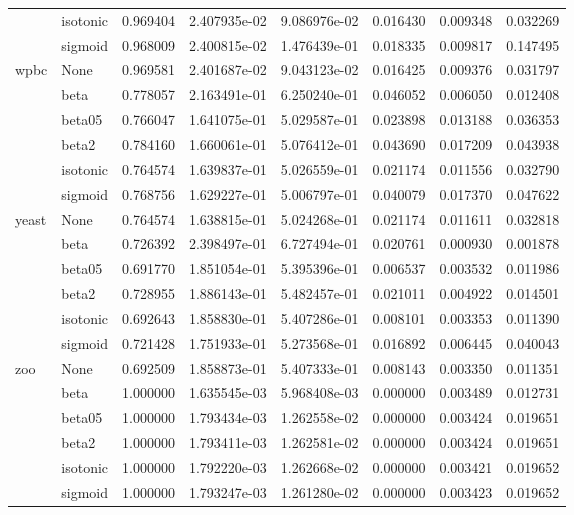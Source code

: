 \begin{tabular}{llrrrrrr}
        & isotonic &  0.969404 &  2.407935e-02 &  9.086976e-02 &  0.016430 &  0.009348 &  0.032269 \\
        & sigmoid &  0.968009 &  2.400815e-02 &  1.476439e-01 &  0.018335 &  0.009817 &  0.147495 \\
wpbc & None &  0.969581 &  2.401687e-02 &  9.043123e-02 &  0.016425 &  0.009376 &  0.031797 \\
        & beta &  0.778057 &  2.163491e-01 &  6.250240e-01 &  0.046052 &  0.006050 &  0.012408 \\
        & beta05 &  0.766047 &  1.641075e-01 &  5.029587e-01 &  0.023898 &  0.013188 &  0.036353 \\
        & beta2 &  0.784160 &  1.660061e-01 &  5.076412e-01 &  0.043690 &  0.017209 &  0.043938 \\
        & isotonic &  0.764574 &  1.639837e-01 &  5.026559e-01 &  0.021174 &  0.011556 &  0.032790 \\
        & sigmoid &  0.768756 &  1.629227e-01 &  5.006797e-01 &  0.040079 &  0.017370 &  0.047622 \\
yeast & None &  0.764574 &  1.638815e-01 &  5.024268e-01 &  0.021174 &  0.011611 &  0.032818 \\
        & beta &  0.726392 &  2.398497e-01 &  6.727494e-01 &  0.020761 &  0.000930 &  0.001878 \\
        & beta05 &  0.691770 &  1.851054e-01 &  5.395396e-01 &  0.006537 &  0.003532 &  0.011986 \\
        & beta2 &  0.728955 &  1.886143e-01 &  5.482457e-01 &  0.021011 &  0.004922 &  0.014501 \\
        & isotonic &  0.692643 &  1.858830e-01 &  5.407286e-01 &  0.008101 &  0.003353 &  0.011390 \\
        & sigmoid &  0.721428 &  1.751933e-01 &  5.273568e-01 &  0.016892 &  0.006445 &  0.040043 \\
zoo & None &  0.692509 &  1.858873e-01 &  5.407333e-01 &  0.008143 &  0.003350 &  0.011351 \\
        & beta &  1.000000 &  1.635545e-03 &  5.968408e-03 &  0.000000 &  0.003489 &  0.012731 \\
        & beta05 &  1.000000 &  1.793434e-03 &  1.262558e-02 &  0.000000 &  0.003424 &  0.019651 \\
        & beta2 &  1.000000 &  1.793411e-03 &  1.262581e-02 &  0.000000 &  0.003424 &  0.019651 \\
        & isotonic &  1.000000 &  1.792220e-03 &  1.262668e-02 &  0.000000 &  0.003421 &  0.019652 \\
        & sigmoid &  1.000000 &  1.793247e-03 &  1.261280e-02 &  0.000000 &  0.003423 &  0.019652 \\
\bottomrule
\end{tabular}

